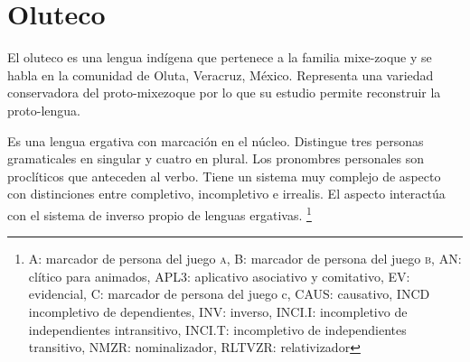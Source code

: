 \section*{Oluteco}

\noindent El oluteco es una lengua indígena que pertenece a la familia mixe-zoque y se habla en la comunidad de Oluta, Veracruz, México. Representa una variedad conservadora del proto-mixezoque por lo que su estudio permite reconstruir la proto-lengua.

Es una lengua ergativa con marcación en el núcleo. Distingue tres personas gramaticales en singular y cuatro en plural. Los pronombres personales son proclíticos que anteceden al verbo. Tiene un sistema muy complejo de aspecto con distinciones entre completivo, incompletivo e irrealis. El aspecto interactúa con el sistema de inverso propio de lenguas ergativas.
\footnote{A: marcador de persona del juego \textsc{a}, B: marcador de persona del juego \textsc{b}, AN: clítico para animados, APL3: aplicativo asociativo y comitativo, EV: evidencial, C: marcador de persona del juego c, CAUS: causativo,  INCD incompletivo de dependientes, INV: inverso, INCI.I: incompletivo de independientes intransitivo, INCI.T: incompletivo de independientes transitivo, NMZR: nominalizador, RLTVZR: relativizador}
\vspace{0.2cm}

